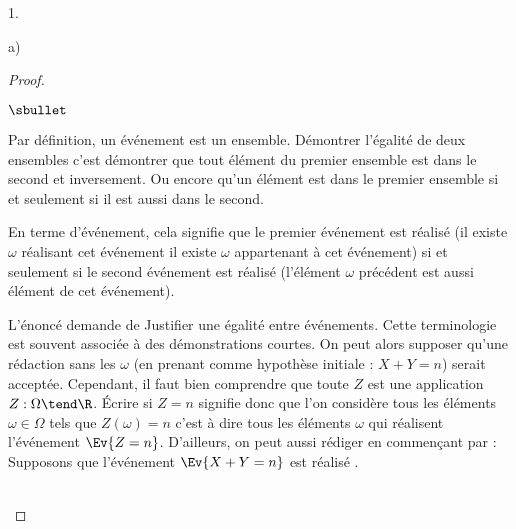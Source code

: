 \begin{noliste}{1.}
\begin{noliste}{a)}
\begin{proof}


      \begin{remarkL}{1}%
        \begin{noliste}{$\sbullet$}
        \item Par définition, un événement est un
          ensemble. Démontrer l'égalité de deux ensembles c'est
          démontrer que tout élément du premier ensemble est dans le
          second et inversement. Ou encore qu'un élément est dans le
          premier ensemble si et seulement si il est aussi dans le
          second.
        \item En terme d'événement, cela signifie que le premier
          événement est réalisé (il existe $\omega$ réalisant cet
          événement \ie il existe $\omega$ appartenant à cet
          événement) si et seulement si le second événement est
          réalisé (l'élément $\omega$ précédent est aussi élément de
          cet événement).
        \item L'énoncé demande de \og Justifier \fg{} une égalité
          entre événements. Cette terminologie est souvent associée à
          des démonstrations courtes. On peut alors supposer qu'une
          rédaction sans les $\omega$ (en prenant comme hypothèse
          initiale : $X + Y = n$) serait acceptée. Cependant, il faut
          bien comprendre que toute \var $Z$ est une application $Z :
          \Omega \tend \R$. Écrire \og si $Z = n$ \fg{} signifie donc
          que l'on considère tous les éléments $\omega \in \Omega$
          tels que $Z(\omega) = n$ c'est à dire tous les éléments
          $\omega$ qui réalisent l'événement $\Ev{Z = n}$. D'ailleurs,
          on peut aussi rédiger en commençant par : \og Supposons que
          l'événement $\Ev{X + Y = n}$ est réalisé \fg{}.          
        \end{noliste}          
      \end{remarkL}~\\[-1.4cm]
    \end{proof}


\end{noliste}
\end{noliste}
